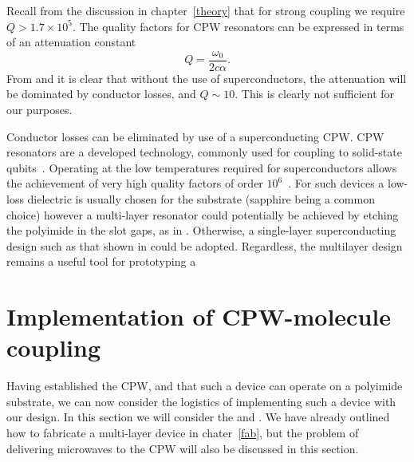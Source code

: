 Recall from the discussion in chapter~\ref{theory} that for strong coupling we
require $Q > 1.7 \times 10^5$. The quality factors for CPW resonators can be
expressed in terms of an attenuation constant
%
\begin{equation}
  Q = \frac{\omega_0}{2c\alpha}.
  \label{mws:eqn:Qalpha}
\end{equation}
%
From  and  it is
clear that without the use of superconductors, the attenuation will be
dominated by conductor losses, and $Q\sim10$. This is clearly not sufficient
for our purposes.

Conductor losses can be eliminated by use of a superconducting CPW. CPW
resonators are a developed technology, commonly used for coupling to
solid-state qubits~\cite{Wallraff2004}. Operating at the low temperatures
required for superconductors allows the achievement of very high quality
factors of order $10^6$~\cite{doi:10.1063/1.3552890, Day2003}. For such devices
a low-loss dielectric is usually chosen for the substrate (sapphire being a
common choice) however a multi-layer resonator could potentially be achieved by
etching the polyimide in the slot gaps, as in . Otherwise, a
single-layer superconducting design such as that shown in
 could be adopted. Regardless, the multilayer design
remains a useful tool for prototyping a 


\section{Implementation of CPW-molecule coupling}
\label{mws:integrating}

Having established the CPW, and that such a device can operate on a polyimide
substrate, we can now consider the logistics of implementing such a device
with our design. In this section we will consider the  and . We have already outlined how to fabricate a multi-layer device
in chater~\ref{fab}, but the problem of delivering microwaves to the CPW
will also be discussed in this section.

